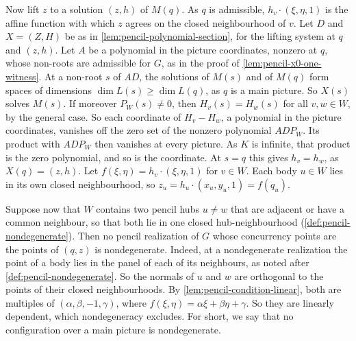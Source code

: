 \begin{remark}
  Now lift $z$ to a solution $(z, h)$ of $M(q)$. As $q$ is admissible,
  $h_v \cdot (\xi, \eta, 1)$ is the affine function with which $z$ agrees
  on the closed neighbourhood of $v$. Let $D$ and $X = (Z, H)$ be as in
  \cref{lem:pencil-polynomial-section}, for the lifting system at $q$ and
  $(z, h)$. Let $A$ be a polynomial in the picture coordinates, nonzero
  at $q$, whose non-roots are admissible for $G$, as in the proof of
  \cref{lem:pencil-x0-one-witness}. At a non-root $s$ of $AD$, the
  solutions of $M(s)$ and of $M(q)$ form spaces of dimensions
  $\dim L(s) \ge \dim L(q)$, as $q$ is a main picture. So $X(s)$ solves
  $M(s)$. If moreover $P_W(s) \neq 0$, then $H_v(s) = H_w(s)$ for all
  $v, w \in W$, by the general case. So each coordinate of $H_v - H_w$, a
  polynomial in the picture coordinates, vanishes off the zero set of the
  nonzero polynomial $A D P_W$. Its product with $A D P_W$ then vanishes
  at every picture. As $K$ is infinite, that product is the zero
  polynomial, and so is the coordinate. At $s = q$ this gives
  $h_v = h_w$, as $X(q) = (z, h)$. Let $f(\xi, \eta) = h_v \cdot (\xi,
  \eta, 1)$ for $v \in W$. Each body $u \in W$ lies in its own closed
  neighbourhood, so $z_u = h_u \cdot (x_u, y_u, 1) = f(q_u)$.

  Suppose now that $W$ contains two pencil hubs $u \neq w$ that are
  adjacent or have a common neighbour, so that both lie in one closed
  hub-neighbourhood (\cref{def:pencil-nondegenerate}). Then no pencil
  realization of $G$ whose concurrency points are the points of $(q, z)$
  is nondegenerate. Indeed, at a nondegenerate realization the point of a
  body lies in the panel of each of its neighbours, as noted after
  \cref{def:pencil-nondegenerate}. So the normals of $u$ and $w$ are
  orthogonal to the points of their closed neighbourhoods. By
  \cref{lem:pencil-condition-linear}, both are multiples of
  $(\alpha, \beta, -1, \gamma)$, where
  $f(\xi, \eta) = \alpha\xi + \beta\eta + \gamma$. So they are linearly
  dependent, which nondegeneracy excludes. For short, we say that no
  configuration over a main picture is nondegenerate.


\end{remark}
